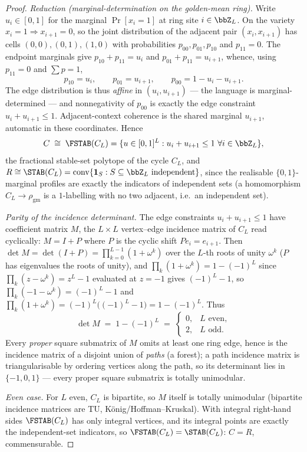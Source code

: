 \begin{proof}
\emph{Reduction (marginal-determination on the golden-mean ring).} Write
$u_i\in[0,1]$ for the marginal $\Pr[x_i=1]$ at ring site $i\in\bbZ_L$. On the
variety $x_i=1\Rightarrow x_{i+1}=0$, so the joint distribution of the adjacent
pair $(x_i,x_{i+1})$ has cells $(0,0),(0,1),(1,0)$ with probabilities
$p_{00},p_{01},p_{10}$ and $p_{11}=0$. The endpoint marginals give
$p_{10}+p_{11}=u_i$ and $p_{01}+p_{11}=u_{i+1}$, whence, using $p_{11}=0$ and
$\sum p=1$,
\[
  p_{10}=u_i,\qquad p_{01}=u_{i+1},\qquad p_{00}=1-u_i-u_{i+1}.
\]
The edge distribution is thus \emph{affine} in $(u_i,u_{i+1})$ --- the language is
marginal-determined --- and nonnegativity of $p_{00}$ is exactly the edge
constraint $u_i+u_{i+1}\le 1$. Adjacent-context coherence is the shared marginal
$u_{i+1}$, automatic in these coordinates. Hence
\[
  C \;\cong\; \FSTAB(C_L)=\{u\in[0,1]^L : u_i+u_{i+1}\le 1\ \forall i\in\bbZ_L\},
\]
the fractional stable-set polytope of the cycle $C_L$, and
$R\cong\STAB(C_L)=\operatorname{conv}\{\mathbf 1_S : S\subseteq\bbZ_L\text{
independent}\}$, since the realisable $\{0,1\}$-marginal profiles are exactly the
indicators of independent sets (a homomorphism $C_L\to\rho_{\mathrm{gm}}$ is a
$1$-labelling with no two adjacent, i.e.\ an independent set).

\emph{Parity of the incidence determinant.} The edge constraints
$u_i+u_{i+1}\le1$ have coefficient matrix $M$, the $L\times L$ vertex--edge
incidence matrix of $C_L$ read cyclically: $M=I+P$ where $P$ is the cyclic shift
$P e_i = e_{i+1}$. Then $\det M=\det(I+P)=\prod_{k=0}^{L-1}(1+\omega^k)$ over the
$L$-th roots of unity $\omega^k$ ($P$ has eigenvalues the roots of unity), and
$\prod_{k}(1+\omega^k)=1-(-1)^L$ since $\prod_k(z-\omega^k)=z^L-1$ evaluated at
$z=-1$ gives $(-1)^L-1$, so $\prod_k(-1-\omega^k)=(-1)^L-1$ and
$\prod_k(1+\omega^k)=(-1)^L\bigl((-1)^L-1\bigr)=1-(-1)^L$. Thus
\[
  \det M \;=\; 1-(-1)^L \;=\;
  \begin{cases}0,& L\text{ even},\\ 2,& L\text{ odd}.\end{cases}
\]
Every \emph{proper} square submatrix of $M$ omits at least one ring edge, hence
is the incidence matrix of a disjoint union of \emph{paths} (a forest); a path
incidence matrix is triangularisable by ordering vertices along the path, so its
determinant lies in $\{-1,0,1\}$ --- every proper square submatrix is totally
unimodular.

\emph{Even case.} For $L$ even, $C_L$ is bipartite, so $M$ itself is totally
unimodular (bipartite incidence matrices are TU, König/Hoffman--Kruskal). With
integral right-hand sides $\FSTAB(C_L)$ has only integral vertices, and its
integral points are exactly the independent-set indicators, so
$\FSTAB(C_L)=\STAB(C_L)$: $C=R$, commensurable.


\end{proof}
